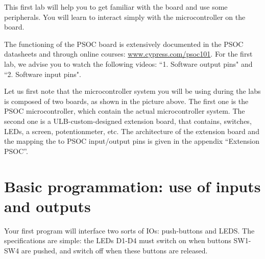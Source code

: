 \documentclass[11pt,a4paper]{article}
\theoremstyle{definition}%
\begin{document}
This first lab will help you to get familiar with the board and use some peripherals. You will learn to interact simply with the microcontroller on the board.

The functioning of the PSOC board is extensively documented in the PSOC datasheets and through online courses: \url{www.cypress.com/psoc101}. For the first lab, we advise you to watch the following videos: ``1. Software output pins" and ``2. Software input pins". 

Let us first note that the microcontroller system you will be using during the labs is composed of two boards, as shown in the picture above. The first one is the PSOC microcontroller, which contain the actual microcontroller system. The second one is a ULB-custom-designed extension board, that contains, switches, LEDs, a screen, potentionmeter, etc. The architecture of the extension board and the mapping the to PSOC input/output pins is given in the appendix ``Extension PSOC''. 





\section{Basic programmation: use of inputs and outputs}
Your first program will interface two sorts of IOs: push-buttons and LEDS.
The specifications are simple: the LEDs D1-D4 must switch on when buttons SW1-SW4 are pushed, and switch off when these buttons are released.
\end{document}
